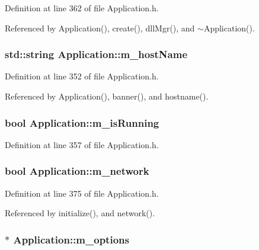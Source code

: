 Definition at line 362 of file Application.h.

Referenced by Application(), create(), dllMgr(), and $\sim$Application().\hypertarget{classApplication_a20094c2bf311e2046942eeeec4a11f02}{
\subsubsection[{m\_\-hostName}]{\setlength{\rightskip}{0pt plus 5cm}std::string {\bf Application::m\_\-hostName}}}
\label{classApplication_a20094c2bf311e2046942eeeec4a11f02}


Definition at line 352 of file Application.h.

Referenced by Application(), banner(), and hostname().\hypertarget{classApplication_ae316ea43e74cc0d536dcbb16b2fbb974}{
\subsubsection[{m\_\-isRunning}]{\setlength{\rightskip}{0pt plus 5cm}bool {\bf Application::m\_\-isRunning}}}
\label{classApplication_ae316ea43e74cc0d536dcbb16b2fbb974}


Definition at line 357 of file Application.h.\hypertarget{classApplication_a7dc2bb72356cd9186eaad49eb506995a}{
\subsubsection[{m\_\-network}]{\setlength{\rightskip}{0pt plus 5cm}bool {\bf Application::m\_\-network}}}
\label{classApplication_a7dc2bb72356cd9186eaad49eb506995a}


Definition at line 375 of file Application.h.

Referenced by initialize(), and network().\hypertarget{classApplication_a3b0c74bf1ba99a5042990e3fefaa8963}{
\subsubsection[{m\_\-options}]{$\ast$ {\bf Application::m\_\-options}}}
\label{classApplication_a3b0c74bf1ba99a5042990e3fefaa8963}


